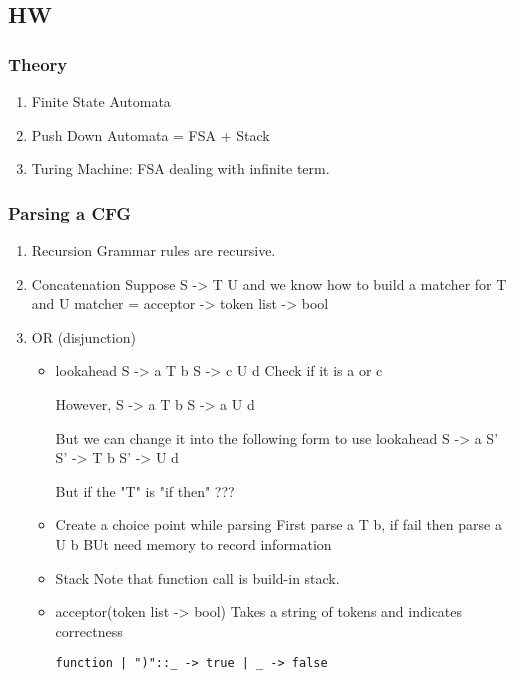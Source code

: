 \documentclass[11pt]{article}
\begin{document}
\subsection{HW}
\label{sec:org40272d1}
\subsubsection{Theory}
\label{sec:orgce00f6e}
\begin{enumerate}
\item Finite State Automata
\item Push Down Automata = FSA + Stack
\item Turing Machine: FSA dealing with infinite term.
\end{enumerate}

\subsubsection{Parsing a CFG}
\label{sec:org985bd24}
\begin{enumerate}
\item Recursion
Grammar rules are recursive.
\item Concatenation
Suppose S -> T U and we know how to build a matcher for T and U
matcher = acceptor -> token list -> bool

\item OR (disjunction)
\begin{itemize}
\item lookahead
S -> a T b
S -> c U d
Check if it is a or c

However,
S -> a T b
S -> a U d

But we can change it into the following form to use lookahead
S -> a S'
S' -> T b
S' -> U d

But if the "T" is "if then"  ???

\item Create a choice point while parsing
First parse a T b, if fail then parse a U b
BUt need memory to record information

\item Stack
Note that function call is build-in stack.

\item acceptor(token list -> bool)
Takes a string of tokens and indicates correctness
\begin{verbatim}
function | ")"::_ -> true | _ -> false
\end{verbatim}
\end{itemize}
\end{enumerate}
\end{document}
